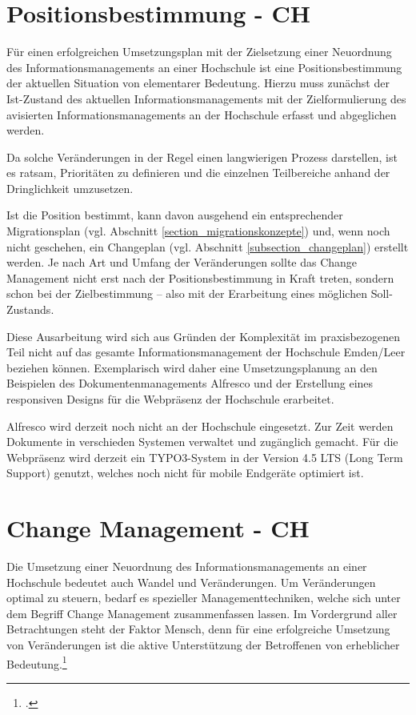 \section{Positionsbestimmung - CH}
Für einen erfolgreichen Umsetzungsplan mit der Zielsetzung einer Neuordnung des Informationsmanagements an einer Hochschule ist eine Positionsbestimmung der aktuellen Situation von elementarer Bedeutung. Hierzu muss zunächst der Ist-Zustand des aktuellen Informationsmanagements mit der Zielformulierung des avisierten Informationsmanagements an der Hochschule erfasst und abgeglichen werden. 

Da solche Veränderungen in der Regel einen langwierigen Prozess darstellen, ist es ratsam, Prioritäten zu definieren und die einzelnen Teilbereiche anhand der Dringlichkeit umzusetzen.

Ist die Position bestimmt, kann davon ausgehend ein entsprechender Migrationsplan (vgl. Abschnitt \ref{section_migrationskonzepte}) und, wenn noch nicht geschehen, ein Changeplan (vgl. Abschnitt \ref{subsection_changeplan}) erstellt werden. Je nach Art und Umfang der Veränderungen sollte das Change Management nicht erst nach der Positionsbestimmung in Kraft treten, sondern schon bei der Zielbestimmung – also mit der Erarbeitung eines möglichen Soll-Zustands.

Diese Ausarbeitung wird sich aus Gründen der Komplexität im praxisbezogenen Teil nicht auf das gesamte Informationsmanagement der Hochschule Emden/Leer beziehen können. Exemplarisch wird daher eine Umsetzungsplanung an den Beispielen des Dokumentenmanagements Alfresco und der Erstellung eines responsiven Designs für die Webpräsenz der Hochschule erarbeitet.

Alfresco wird derzeit noch nicht an der Hochschule eingesetzt. Zur Zeit werden Dokumente in verschieden Systemen verwaltet und zugänglich gemacht. Für die Webpräsenz wird derzeit ein TYPO3-System in der Version 4.5 LTS (Long Term Support) genutzt, welches noch nicht für mobile Endgeräte optimiert ist.

\section{Change Management - CH}
Die Umsetzung einer Neuordnung des Informationsmanagements an einer Hochschule bedeutet auch Wandel und Veränderungen. Um Veränderungen optimal zu steuern, bedarf es spezieller Managementtechniken, welche sich unter dem Begriff Change Management zusammenfassen lassen. Im Vordergrund aller Betrachtungen steht der Faktor Mensch, denn für eine erfolgreiche Umsetzung von Veränderungen ist die aktive Unterstützung der Betroffenen von erheblicher Bedeutung.\footcite[Vgl.][]{lauer_change_2014}

